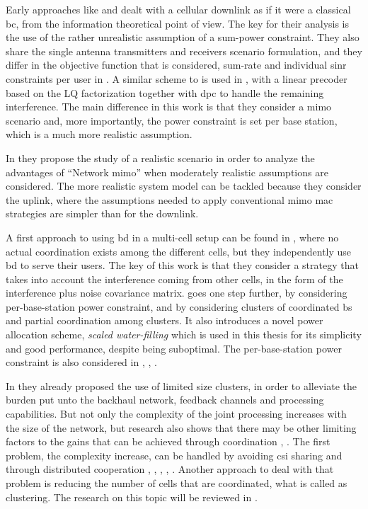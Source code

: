 Early approaches like \cite{shamai01} and \cite{schubert02} dealt with a
cellular downlink as if it were a classical \gls{bc}, from the information
theoretical point of view. The key for their analysis is the use of the rather
unrealistic assumption of a sum-power constraint. They also share the single
antenna transmitters and receivers scenario formulation, and they differ in the
objective function that is considered, sum-rate \cite{shamai01} and individual
\gls{sinr} constraints per user in \cite{schubert02}. A similar scheme to
\cite{shamai01, schubert02} is used in \cite{karakayali06b}, with a linear
precoder based on the LQ factorization together with \gls{dpc} to handle the
remaining interference. The main difference in this work is that they consider a
\gls{mimo} scenario and, more importantly, the power constraint is set per base
station, which is a much more realistic assumption.

In \cite{venkatesan07} they propose the study of a realistic scenario in order
to analyze the advantages of ``Network \gls{mimo}'' when moderately realistic
assumptions are considered. The more realistic system model can be tackled
because they consider the uplink, where the assumptions needed to apply
conventional \gls{mimo} \gls{mac} strategies are simpler than for the downlink.

A first approach to using \gls{bd} in a multi-cell setup can be found in
\cite{shim08}, where no actual coordination exists among the different cells,
but they independently use \gls{bd} to serve their users. The key of this work
is that they consider a strategy that takes into account the interference coming
from other cells, in the form of the interference plus noise covariance matrix.
\cite{zhang09} goes one step further, by considering per-base-station power
constraint, and by considering clusters of coordinated \gls{bs} and partial
coordination among clusters. It also introduces a novel power allocation scheme,
\emph{scaled water-filling} which is used in this thesis for its simplicity and
good performance, despite being suboptimal. The per-base-station power
constraint is also considered in \cite{zhang10b}, \cite{liu09},
\cite{boccardi06}.

In \cite{shim08} they already proposed the use of limited size clusters, in
order to alleviate the burden put unto the backhaul network, feedback channels
and processing capabilities. But not only the complexity of the joint processing
increases with the size of the network, but research also shows that there may
be other limiting factors to the gains that can be achieved through coordination
\cite{lozano13}, \cite{barbieri12}. The first problem, the complexity increase,
can be handled by avoiding \gls{csi} sharing and through distributed cooperation
\cite{sun11}, \cite{bjornson10}, \cite{huang11}, \cite{bogale12}, \cite{he14}.
Another approach to deal with that problem is reducing the number of cells that
are coordinated, what is called as clustering. The research on this topic will
be reviewed in .

